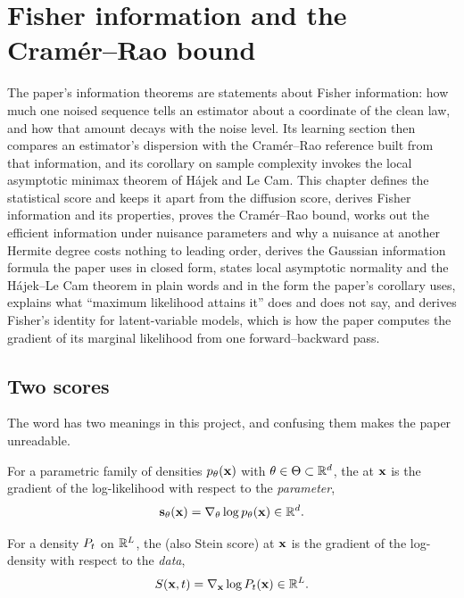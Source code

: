 \chapter{Fisher information and the Cram\'er--Rao bound}
\label{ch:fisher-cramer-rao}

The paper's information theorems are statements about Fisher information: how much
one noised sequence tells an estimator about a coordinate of the clean law, and how
that amount decays with the noise level. Its learning section then compares an
estimator's dispersion with the Cram\'er--Rao reference built from that information,
and its corollary on sample complexity invokes the local asymptotic minimax theorem
of H\'ajek and Le Cam. This chapter defines the statistical score and keeps it apart
from the diffusion score, derives Fisher information and its properties, proves the
Cram\'er--Rao bound, works out the efficient information under nuisance parameters and
why a nuisance at another Hermite degree costs nothing to leading order, derives the
Gaussian information formula the paper uses in closed form, states local asymptotic
normality and the H\'ajek--Le Cam theorem in plain words and in the form the paper's
corollary uses, explains what ``maximum likelihood attains it'' does and does not say,
and derives Fisher's identity for latent-variable models, which is how the paper
computes the gradient of its marginal likelihood from one forward--backward pass.

\section{Two scores}
\label{sec:two-scores}

The word  has two meanings in this project, and confusing them makes the
paper unreadable.

\begin{definition}
For a parametric family of densities $p_\theta(\mathbf{x})$ with $\theta\in\Theta\subset\mathbb{R}^d$,
the  at $\mathbf{x}$ is the gradient of the log-likelihood with
respect to the \emph{parameter},
\begin{equation}
  \mathbf{s}_\theta(\mathbf{x})=\nabla_\theta\log p_\theta(\mathbf{x})\in\mathbb{R}^d .
\end{equation}
\end{definition}

\begin{definition}
For a density $P_t$ on $\mathbb{R}^{L}$, the  (also Stein score)
at $\mathbf{x}$ is the gradient of the log-density with respect to the \emph{data},
\begin{equation}
  S(\mathbf{x},t)=\nabla_{\mathbf{x}}\log P_t(\mathbf{x})\in\mathbb{R}^{L}.
\end{equation}
\end{definition}

